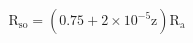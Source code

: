 \documentclass[12pt]{article}
\begin{document}
\begin{displaymath}
\mathrm{R}_{\mathrm{so}}=\left(0.75+2 \times 10^{-5} \mathrm{z}\right) \mathrm{R}_{\mathrm{a}}
\end{displaymath}
\end{document}
